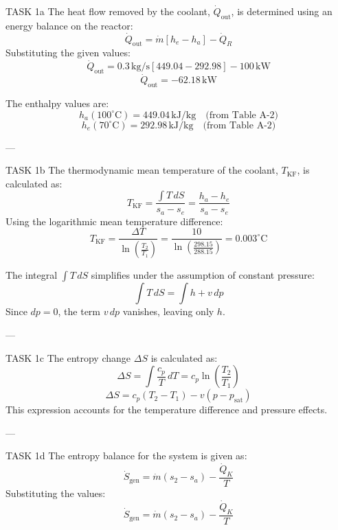 TASK 1a  
The heat flow removed by the coolant, \( \dot{Q}_{\text{out}} \), is determined using an energy balance on the reactor:  
\[
\dot{Q}_{\text{out}} = \dot{m} \left[ h_e - h_a \right] - \dot{Q}_R
\]  
Substituting the given values:  
\[
\dot{Q}_{\text{out}} = 0.3 \, \text{kg/s} \left[ 449.04 - 292.98 \right] - 100 \, \text{kW}
\]  
\[
\dot{Q}_{\text{out}} = -62.18 \, \text{kW}
\]  

The enthalpy values are:  
\[
h_a (100^\circ\text{C}) = 449.04 \, \text{kJ/kg} \quad \text{(from Table A-2)}
\]  
\[
h_e (70^\circ\text{C}) = 292.98 \, \text{kJ/kg} \quad \text{(from Table A-2)}
\]  

---

TASK 1b  
The thermodynamic mean temperature of the coolant, \( T_{\text{KF}} \), is calculated as:  
\[
T_{\text{KF}} = \frac{\int T \, dS}{s_a - s_e} = \frac{h_a - h_e}{s_a - s_e}
\]  
Using the logarithmic mean temperature difference:  
\[
T_{\text{KF}} = \frac{\Delta T}{\ln \left( \frac{T_2}{T_1} \right)} = \frac{10}{\ln \left( \frac{298.15}{288.15} \right)} = 0.003^\circ\text{C}
\]  

The integral \( \int T \, dS \) simplifies under the assumption of constant pressure:  
\[
\int T \, dS = \int h + v \, dp
\]  
Since \( dp = 0 \), the term \( v \, dp \) vanishes, leaving only \( h \).  

---

TASK 1c  
The entropy change \( \Delta S \) is calculated as:  
\[
\Delta S = \int \frac{c_p}{T} \, dT = c_p \ln \left( \frac{T_2}{T_1} \right)
\]  
\[
\Delta S = c_p \left( T_2 - T_1 \right) - v \left( p - p_{\text{sat}} \right)
\]  
This expression accounts for the temperature difference and pressure effects.  

---

TASK 1d  
The entropy balance for the system is given as:  
\[
\dot{S}_{\text{gen}} = \dot{m} \left( s_2 - s_a \right) - \frac{\dot{Q}_K}{T}
\]  
Substituting the values:  
\[
\dot{S}_{\text{gen}} = \dot{m} \left( s_2 - s_a \right) - \frac{\dot{Q}_K}{T}
\]